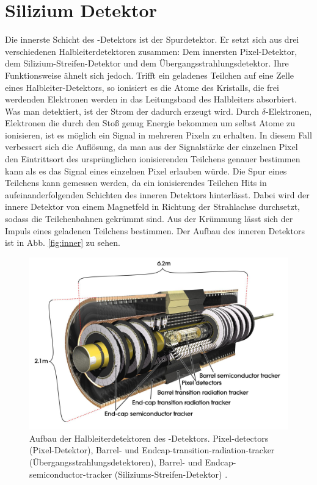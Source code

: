 \section{Silizium Detektor}
Die innerste Schicht des \atlas-Detektors ist der Spurdetektor. Er setzt sich aus drei verschiedenen Halbleiterdetektoren zusammen: Dem innersten Pixel-Detektor, dem Silizium-Streifen-Detektor und dem Übergangsstrahlungsdetektor\cite{atlas_build}. Ihre Funktionsweise ähnelt sich jedoch. Trifft ein geladenes Teilchen auf eine Zelle eines Halbleiter-Detektors, so ionisiert es die Atome des Kristalls, die frei werdenden Elektronen werden in das Leitungsband des Halbleiters absorbiert. Was man detektiert, ist der Strom der dadurch erzeugt wird. Durch $\delta$-Elektronen, Elektronen die durch den Stoß genug Energie bekommen um selbst Atome zu ionisieren, ist es möglich ein Signal in mehreren Pixeln zu erhalten. In diesem Fall verbessert sich die Auflösung, da man aus der Signalstärke der einzelnen Pixel den Eintrittsort des ursprünglichen ionisierenden Teilchens genauer bestimmen kann als es das Signal eines einzelnen Pixel erlauben würde. Die Spur eines Teilchens kann gemessen werden, da ein ionisierendes Teilchen Hits in aufeinanderfolgenden Schichten des inneren Detektors hinterlässt. Dabei wird der innere Detektor von einem Magnetfeld in Richtung der Strahlachse durchsetzt, sodass die Teilchenbahnen gekrümmt sind. Aus der Krümmung lässt sich der Impuls eines geladenen Teilchens bestimmen. Der Aufbau des inneren Detektors ist in Abb. \ref{fig:inner} zu sehen.
\begin{figure}
\centering
\includegraphics[scale = 0.5]{input/innerdetector.jpg}\caption{Aufbau der Halbleiterdetektoren des \atlas-Detektors. Pixel-detectors (Pixel-Detektor), Barrel- und Endcap-transition-radiation-tracker (Übergangsstrahlungsdetektoren), Barrel- und Endcap-semiconductor-tracker (Siliziums-Streifen-Detektor) \cite{atlas_build}.}
\end{figure}


